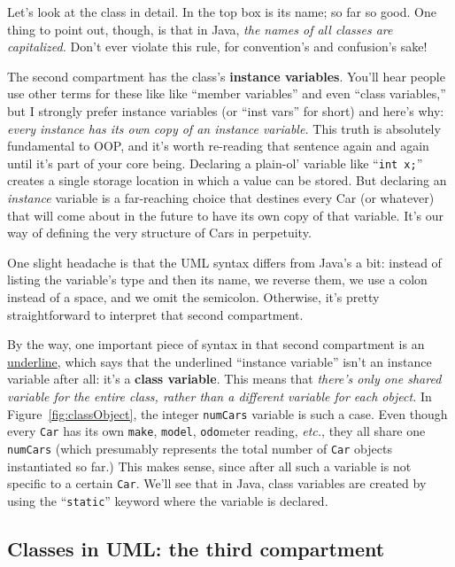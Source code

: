 Let's look at the class in detail. In the top box is its name; so far so good.
One thing to point out, though, is that in Java, \textit{the names of all
classes are capitalized.} Don't ever violate this rule, for convention's and
confusion's sake!

The second compartment has the class's \textbf{instance variables}. You'll
hear people use other terms for these like like ``member variables'' and even
``class variables,'' but I strongly prefer instance variables (or ``inst vars''
for short) and here's why: \textit{every instance has its own copy of an
instance variable.} This truth is absolutely fundamental to OOP, and it's
worth re-reading that sentence again and again until it's part of your core
being. Declaring a plain-ol' variable like ``\texttt{int x;}'' creates a single
storage location in which a value can be stored. But declaring an
\textit{instance} variable is a far-reaching choice that destines every Car
(or whatever) that will come about in the future to have its own copy of that
variable. It's our way of defining the very structure of Cars in perpetuity.

One slight headache is that the UML syntax differs from Java's a bit: instead
of listing the variable's type and then its name, we reverse them, we use
a colon instead of a space, and we omit the semicolon. Otherwise, it's pretty
straightforward to interpret that second compartment.

By the way, one important piece of syntax in that second compartment is an
\underline{underline}, which says that the underlined ``instance variable''
isn't an instance variable after all: it's a \textbf{class variable}. This
means that \textit{there's only one shared variable for the entire class,
rather than a different variable for each object.} In
Figure~\ref{fig:classObject}, the integer \texttt{numCars} variable is such a
case. Even though every \texttt{Car} has its own \texttt{make},
\texttt{model}, \texttt{odo}meter reading, \textit{etc.}, they all share one
\texttt{numCars} (which presumably represents the total number of \texttt{Car}
objects instantiated so far.) This makes sense, since after all such a
variable is not specific to a certain \texttt{Car}. We'll see that in Java,
class variables are created by using the ``\texttt{static}'' keyword where the
variable is declared.

\subsection{Classes in UML: the third compartment}

